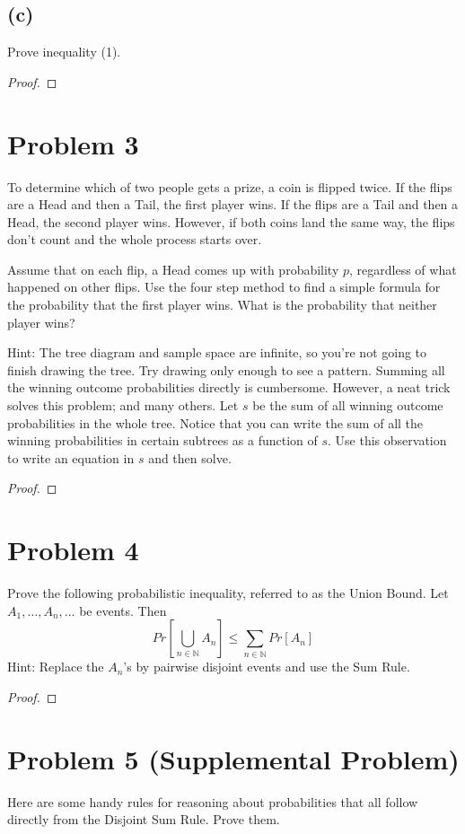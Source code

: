 \documentclass[14pt]{extarticle}
\begin{document}
\subsection{(c)}
Prove inequality (1).
\begin{proof}
\end{proof}

\section{Problem 3}
To determine which of two people gets a prize, a coin is flipped twice. If the flips are a Head and then a Tail, the first player wins. If the flips are a Tail and then a Head, the second player wins. However, if both coins land the same way, the flips don’t count and the whole process starts over.

Assume that on each flip, a Head comes up with probability $p$, regardless of what happened on other flips. Use the four step method to find a simple formula for the probability that the first player wins. What is the probability that neither player wins?

Hint: The tree diagram and sample space are infinite, so you’re not going to finish drawing the tree. Try drawing only enough to see a pattern. Summing all the winning outcome probabilities directly is cumbersome. However, a neat trick solves this problem; and many others. Let $s$ be the sum of all winning outcome probabilities in the whole tree. Notice that you can write the sum of all the winning probabilities in certain subtrees as a function of $s$. Use this observation to write an equation in $s$ and then solve.
\begin{proof}
\end{proof}

\section{Problem 4}
Prove the following probabilistic inequality, referred to as the Union Bound. Let $A_1, \ldots, A_n, \ldots$ be events. Then
$$
Pr\left[\bigcup_{n \in \mathbb{N}}A_n\right] \leq \sum_{n \in \mathbb{N}}Pr[A_n]
$$
Hint: Replace the $A_n$’s by pairwise disjoint events and use the Sum Rule.
\begin{proof}
\end{proof}

\section{Problem 5 (Supplemental Problem)}
Here are some handy rules for reasoning about probabilities that all follow directly from the Disjoint Sum Rule. Prove them.
\end{document}
